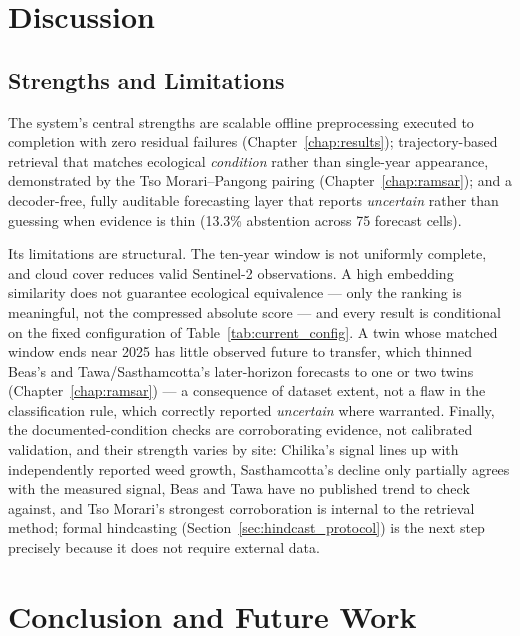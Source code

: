 \documentclass[12pt,a4paper,oneside]{report}
\begin{document}
\chapter{Discussion}
\label{chap:discussion}

\section{Strengths and Limitations}

The system's central strengths are scalable offline preprocessing
executed to completion with zero residual failures
(Chapter~\ref{chap:results}); trajectory-based retrieval that
matches ecological \emph{condition} rather than single-year
appearance, demonstrated by the Tso Morari--Pangong pairing
(Chapter~\ref{chap:ramsar}); and a decoder-free, fully auditable
forecasting layer that reports \emph{uncertain} rather than guessing
when evidence is thin (13.3\% abstention across 75 forecast cells).

Its limitations are structural. The ten-year window is not
uniformly complete, and cloud cover reduces valid Sentinel-2
observations. A high embedding similarity does not guarantee
ecological equivalence --- only the ranking is meaningful, not the
compressed absolute score --- and every result is conditional on the
fixed configuration of Table~\ref{tab:current_config}. A twin whose
matched window ends near 2025 has little observed future to
transfer, which thinned Beas's and Tawa/Sasthamcotta's later-horizon
forecasts to one or two twins (Chapter~\ref{chap:ramsar}) --- a
consequence of dataset extent, not a flaw in the classification
rule, which correctly reported \emph{uncertain} where warranted.
Finally, the documented-condition checks are corroborating evidence,
not calibrated validation, and their strength varies by site:
Chilika's signal lines up with independently reported weed growth,
Sasthamcotta's decline only partially agrees with the measured
signal, Beas and Tawa have no published trend to check against, and
Tso Morari's strongest corroboration is internal to the retrieval
method; formal hindcasting (Section~\ref{sec:hindcast_protocol}) is
the next step precisely because it does not require external data.


\chapter{Conclusion and Future Work}
\label{chap:conclusion}
\end{document}
